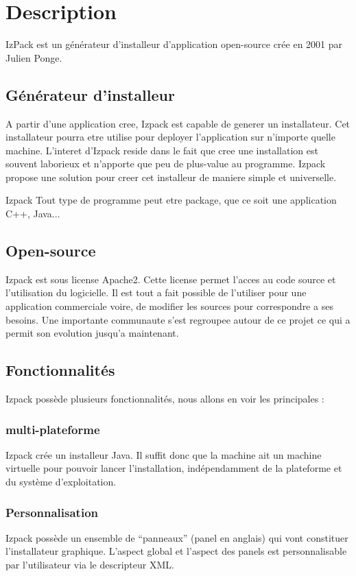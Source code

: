 \section{Description}
IzPack est un générateur d'installeur d'application open-source crée en 2001 par Julien Ponge.
\subsection{Générateur d'installeur}
A partir d'une application cree, Izpack est capable de generer un installateur. Cet installateur pourra etre utilise pour deployer l'application sur n'importe quelle machine. L'interet d'Izpack reside dans le fait que cree une installation est souvent laborieux et n'apporte que peu de plus-value au programme. Izpack propose une solution pour creer cet installeur de maniere simple et universelle. 

Izpack 
Tout type de programme peut etre package, que ce soit une application C++, Java...
\subsection{Open-source}
Izpack est sous license Apache2. Cette license permet l'acces au code source et l'utilisation du logicielle. Il est tout a fait possible de l'utiliser pour une application commerciale voire, de modifier les sources pour correspondre a ses besoins. Une importante communaute s'est regroupee autour de ce projet ce qui a permit son evolution jusqu'a maintenant.

\subsection{Fonctionnalités}
Izpack possède plusieurs fonctionnalités, nous allons en voir les principales :
\subsubsection{multi-plateforme}
Izpack crée un installeur Java. Il suffit donc que la machine ait un machine virtuelle pour pouvoir lancer l'installation, indépendamment de la plateforme et du système d'exploitation.
\subsubsection{Personnalisation}
Izpack possède un ensemble de ``panneaux'' (panel en anglais) qui vont constituer l'installateur graphique. L'aspect global et l'aspect des panels est personnalisable par l'utilisateur via le descripteur XML.
